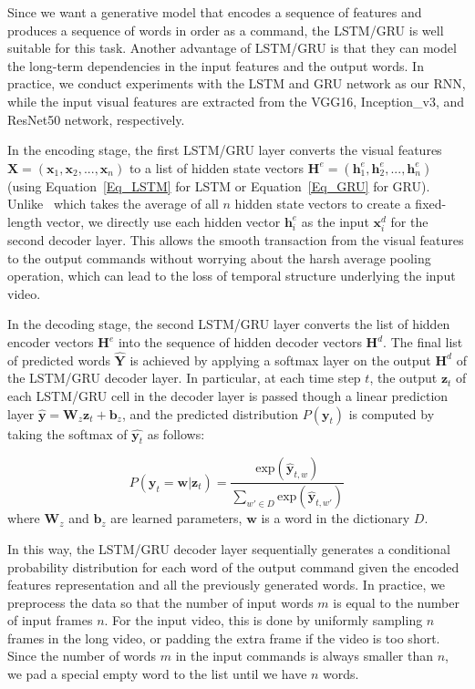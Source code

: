 Since we want a generative model that encodes a sequence of features and produces a sequence of words in order as a command, the LSTM/GRU is well suitable for this task. Another advantage of LSTM/GRU is that they can model the long-term dependencies in the input features and the output words. In practice, we conduct experiments with the LSTM and GRU network as our RNN, while the input visual features are extracted from the VGG16, Inception\_v3, and ResNet50 network, respectively.

In the encoding stage, the first LSTM/GRU layer converts the visual features $\mathbf{X} = (\mathbf{x}_1, \mathbf{x}_2, ..., \mathbf{x}_n)$ to a list of hidden state vectors $\mathbf{H}^e = (\mathbf{h}_1^e, \mathbf{h}_2^e, ..., \mathbf{h}_n^e)$ (using Equation~\ref{Eq_LSTM} for LSTM or Equation~\ref{Eq_GRU} for GRU). Unlike~\cite{venugopalan2014translating} which takes the average of all $n$ hidden state vectors to create a fixed-length vector, we directly use each hidden vector $\mathbf{h}_i^e$ as the input $\mathbf{x}_i^d$ for the second decoder layer. This allows the smooth transaction from the visual features to the output commands without worrying about the harsh average pooling operation, which can lead to the loss of temporal structure underlying the input video.

In the decoding stage, the second LSTM/GRU layer converts the list of hidden encoder vectors $\mathbf{H}^e$ into the sequence of hidden decoder vectors $\mathbf{H}^d$. The final list of predicted words $\mathbf{\hat{Y}}$ is achieved by applying a softmax layer on the output $\mathbf{H}^d$ of the LSTM/GRU decoder layer. In particular, at each time step $t$, the output $\mathbf{z}_t$ of each LSTM/GRU cell in the decoder layer is passed though a linear prediction layer $\hat{\mathbf{y}}=\mathbf{W}_{z}\mathbf{z}_t+\mathbf{b}_z$, and the predicted distribution $P(\mathbf{y}_t)$ is computed by taking the softmax of $\hat{\mathbf{y}_t}$ as follows:


\begin{equation}
P(\mathbf{y}_t=\mathbf{w}|\mathbf{z}_t)=\frac{\text{exp}(\hat{\mathbf{y}}_{t,w})}{\sum_{w'\in{D}}\text{exp}(\hat{\mathbf{y}}_{t,w'})}
\end{equation}
where $\mathbf{W}_z$ and $\mathbf{b}_z$ are learned parameters, $\mathbf{w}$ is a word in the dictionary $D$.

In this way, the LSTM/GRU decoder layer sequentially generates a conditional probability distribution for each word of the output command given the encoded features representation and all the previously generated words. In practice, we preprocess the data so that the number of input words $m$ is equal to the number of input frames $n$. For the input video, this is done by uniformly sampling $n$ frames in the long video, or padding the extra frame if the video is too short. Since the number of words $m$ in the input commands is always smaller than $n$, we pad a special empty word to the list until we have $n$ words.
 

